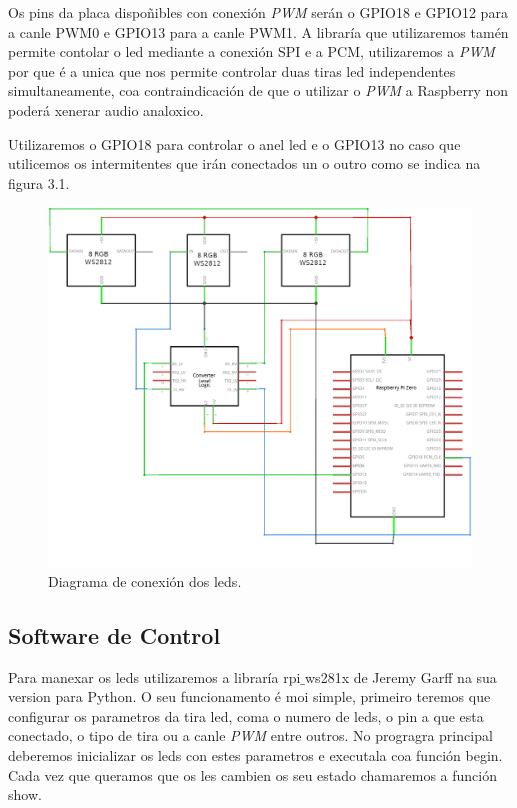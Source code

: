Os pins  da placa dispoñibles con conexión \emph{PWM} serán o GPIO18 e GPIO12 para a canle PWM0 e GPIO13 para a canle PWM1. A libraría que utilizaremos tamén permite contolar o led mediante a conexión SPI e a PCM, utilizaremos a \emph{PWM} por que é a unica que nos permite controlar duas tiras led independentes simultaneamente, coa contraindicación de que o utilizar o \emph{PWM} a Raspberry non poderá xenerar audio analoxico.

Utilizaremos o GPIO18 para controlar o anel led e o GPIO13 no caso que utilicemos os intermitentes que irán conectados un o outro como se indica na figura 3.1.
\begin{figure}[tb]
  \centering
  \includegraphics[scale=1]{imaxes/circuito-leds.png}
  \caption{Diagrama de conexión dos leds.}
  \label{f:conexións cos leds}
\end{figure}

\subsection{Software de Control}
Para manexar os leds utilizaremos a libraría rpi\(\_\)ws281x de Jeremy Garff na sua version para Python. O seu funcionamento é moi simple, primeiro teremos que configurar os parametros da tira led, coma o numero de leds, o pin a que esta conectado, o tipo de tira  ou a canle \emph{PWM} entre outros. No progragra principal deberemos inicializar os leds con estes parametros e executala coa función begin. Cada vez que queramos que os les cambien os seu estado chamaremos a función show.


